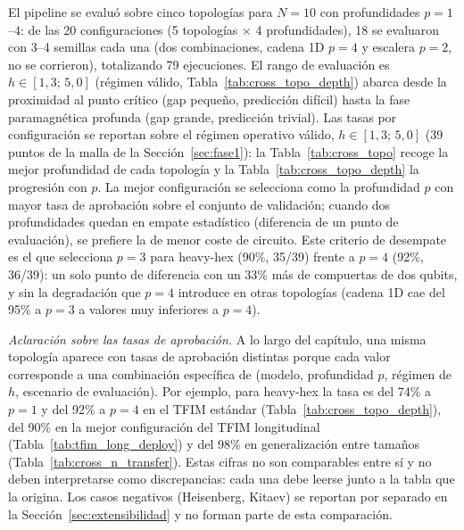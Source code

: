 \documentclass[11pt,a4paper,spanish]{book}
\begin{document}
El pipeline se evaluó sobre cinco topologías para $N = 10$ con profundidades $p = 1$--$4$: de las 20 configuraciones (5 topologías $\times$ 4 profundidades), 18 se evaluaron con 3--4 semillas cada una (dos combinaciones, cadena 1D $p = 4$ y escalera $p = 2$, no se corrieron), totalizando 79 ejecuciones. El rango de evaluación es $h \in [1{,}3;\, 5{,}0]$ (régimen válido, Tabla~\ref{tab:cross_topo_depth}) abarca desde la proximidad al punto crítico (gap pequeño, predicción difícil) hasta la fase paramagnética profunda (gap grande, predicción trivial). Las tasas por configuración se reportan sobre el régimen operativo válido, $h \in [1{,}3;\, 5{,}0]$ (39 puntos de la malla de la Sección~\ref{sec:fase1}): la Tabla~\ref{tab:cross_topo} recoge la mejor profundidad de cada topología y la Tabla~\ref{tab:cross_topo_depth} la progresión con $p$. La mejor configuración se selecciona como la profundidad $p$ con mayor tasa de aprobación sobre el conjunto de validación; cuando dos profundidades quedan en empate estadístico (diferencia de un punto de evaluación), se prefiere la de menor coste de circuito. Este criterio de desempate es el que selecciona $p = 3$ para heavy-hex (90\%, 35/39) frente a $p = 4$ (92\%, 36/39): un solo punto de diferencia con un 33\% más de compuertas de dos qubits, y sin la degradación que $p = 4$ introduce en otras topologías (cadena 1D cae del 95\% a $p = 3$ a valores muy inferiores a $p = 4$).

\noindent\textit{Aclaración sobre las tasas de aprobación.} A lo largo del capítulo, una misma topología aparece con tasas de aprobación distintas porque cada valor corresponde a una combinación específica de (modelo, profundidad $p$, régimen de $h$, escenario de evaluación). Por ejemplo, para heavy-hex la tasa es del 74\% a $p = 1$ y del 92\% a $p = 4$ en el TFIM estándar (Tabla~\ref{tab:cross_topo_depth}), del 90\% en la mejor configuración del TFIM longitudinal (Tabla~\ref{tab:tfim_long_deploy}) y del 98\% en generalización entre tamaños (Tabla~\ref{tab:cross_n_transfer}). Estas cifras no son comparables entre sí y no deben interpretarse como discrepancias: cada una debe leerse junto a la tabla que la origina. Los casos negativos (Heisenberg, Kitaev) se reportan por separado en la Sección~\ref{sec:extensibilidad} y no forman parte de esta comparación.
\end{document}
